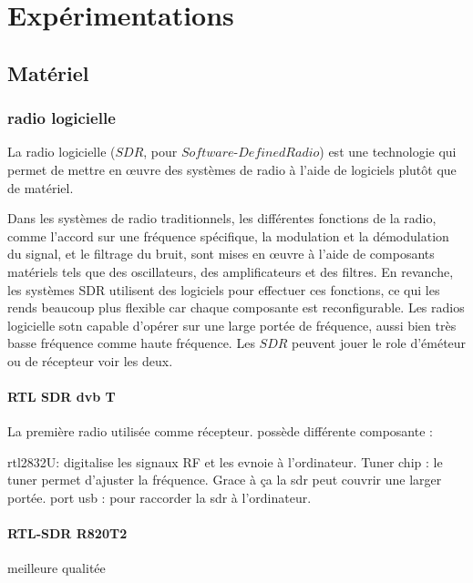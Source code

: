 \chapter{Expérimentations}


\renewcommand{\leftmark}{EXPERIMENTATIONS}

\section{Matériel}

\subsection{radio logicielle}

La radio logicielle ($SDR$, pour $Software$-$Defined Radio$) est une technologie qui permet de mettre en œuvre des systèmes de radio à l'aide de logiciels plutôt que de matériel. 

Dans les systèmes de radio traditionnels, les différentes fonctions de la radio, comme l'accord sur une fréquence spécifique, la modulation et la démodulation du signal, et le filtrage du bruit, sont mises en œuvre à l'aide de composants matériels tels que des oscillateurs, des amplificateurs et des filtres. En revanche, les systèmes SDR utilisent des logiciels pour effectuer ces fonctions, ce qui les rends beaucoup plus flexible car chaque composante est reconfigurable. Les radios logicielle sotn capable d'opérer sur une large portée de fréquence, aussi bien très basse fréquence comme haute fréquence.
Les $SDR$ peuvent jouer le role d'éméteur ou de récepteur voir les deux.

\subsubsection{RTL SDR dvb T}

La première radio utilisée comme récepteur. possède différente composante :

rtl2832U: digitalise les signaux RF et les evnoie à l'ordinateur.
Tuner chip : le tuner permet d'ajuster la fréquence. Grace à ça la sdr peut couvrir une larger portée.
port usb : pour raccorder la sdr à l'ordinateur.

\subsubsection{RTL-SDR R820T2}



meilleure qualitée



